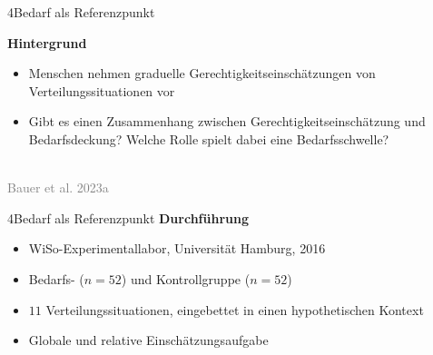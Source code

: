 \documentclass[xcolor=table,9pt,aspectratio=169]{beamer}
\begin{document}
\begin{frame}{\vspace*{10mm}4\hspace*{1em}Bedarf als Referenzpunkt}
\begin{multicols}{2}
   \textbf{Hintergrund}\\
   \medskip
   \begin{itemize}
      \item Menschen nehmen graduelle Gerechtigkeitseinschätzungen von Verteilungssituationen vor
      \item Gibt es einen Zusammenhang zwischen Gerechtigkeitseinschätzung und Bedarfsdeckung? Welche Rolle spielt dabei eine Bedarfsschwelle?
   \end{itemize}
   \vfill
   \begin{center}
      \\
      \footnotesize{\textcolor{gray}{Bauer et al. 2023a}}
   \end{center}
\end{multicols}
\end{frame}


\begin{frame}{\vspace*{10mm}4\hspace*{1em}Bedarf als Referenzpunkt}
\textbf{Durchführung}\\
\medskip
\begin{itemize}
   \item WiSo-Experimentallabor, Universität Hamburg, 2016
   \item Bedarfs- ($n=52$) und Kontrollgruppe ($n=52$)
   \item $11$ Verteilungssituationen, eingebettet in einen hypothetischen Kontext
   \item Globale und relative Einschätzungsaufgabe
\end{itemize}
\end{frame}
\end{document}
